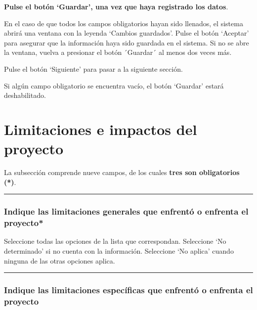 \documentclass[
]{book}
\begin{document}
\textbf{Pulse el botón `Guardar', una vez que haya registrado los datos}.

En el caso de que todos los campos obligatorios hayan sido llenados, el sistema abrirá una ventana con la leyenda `Cambios guardados'. Pulse el botón `Aceptar' para asegurar que la información haya sido guardada en el sistema. Si no se abre la ventana, vuelva a presionar el botón ´Guardar´ al menos dos veces más.

Pulse el botón `Siguiente' para pasar a la siguiente sección.

Si algún campo obligatorio se encuentra vacío, el botón `Guardar' estará deshabilitado.

\hypertarget{limitaciones-e-impactos-del-proyecto}{%
\chapter*{Limitaciones e impactos del proyecto}\label{limitaciones-e-impactos-del-proyecto}}

La subsección comprende nueve campos, de los cuales \textbf{tres son obligatorios ({*})}.

\begin{center}\rule{0.5\linewidth}{0.5pt}\end{center}

\hypertarget{indique-las-limitaciones-generales-que-enfrentuxf3-o-enfrenta-el-proyecto}{%
\subsection*{\texorpdfstring{{Indique las limitaciones generales que enfrentó o enfrenta el proyecto*}}{Indique las limitaciones generales que enfrentó o enfrenta el proyecto*}}\label{indique-las-limitaciones-generales-que-enfrentuxf3-o-enfrenta-el-proyecto}}

Seleccione todas las opciones de la lista que correspondan.
Seleccione `No determinado' si no cuenta con la información.
Seleccione `No aplica' cuando ninguna de las otras opciones aplica.

\begin{center}\rule{0.5\linewidth}{0.5pt}\end{center}

\hypertarget{indique-las-limitaciones-especuxedficas-que-enfrentuxf3-o-enfrenta-el-proyecto}{%
\subsection*{Indique las limitaciones específicas que enfrentó o enfrenta el proyecto}\label{indique-las-limitaciones-especuxedficas-que-enfrentuxf3-o-enfrenta-el-proyecto}}
\end{document}
